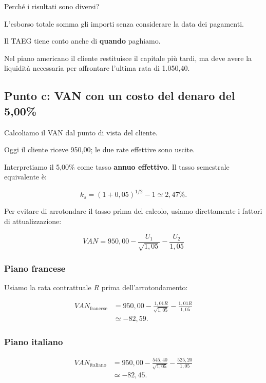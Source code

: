 \noindent Perché i risultati sono diversi?

\noindent L'esborso totale somma gli importi
senza considerare la data dei pagamenti.

\noindent Il TAEG tiene conto anche
di \textbf{quando} paghiamo.

\noindent Nel piano americano il cliente
restituisce il capitale più tardi,
ma deve avere la liquidità necessaria
per affrontare l'ultima rata di 1.050,40.


\subsection*{Punto c: VAN con un costo del denaro del 5,00\%}

\noindent Calcoliamo il VAN
dal punto di vista del cliente.

\noindent Oggi il cliente riceve 950,00;
le due rate effettive sono uscite.

\noindent Interpretiamo il 5,00\%
come tasso \textbf{annuo effettivo}.
Il tasso semestrale equivalente è:

\[
k_s=(1+0{,}05)^{1/2}-1
\simeq2{,}47\%.
\]

\noindent Per evitare di arrotondare il tasso
prima del calcolo, usiamo direttamente
i fattori di attualizzazione:

\[
\boxed{
VAN
=
950{,}00
-\frac{U_1}{\sqrt{1{,}05}}
-\frac{U_2}{1{,}05}
}
\]

\subsubsection*{Piano francese}

\noindent Usiamo la rata contrattuale $R$
prima dell'arrotondamento:

\[
\begin{aligned}
VAN_{\text{francese}}
&=
950{,}00
-\frac{1{,}01R}{\sqrt{1{,}05}}
-\frac{1{,}01R}{1{,}05}\\
&\simeq\boxed{-82{,}59}.
\end{aligned}
\]

\subsubsection*{Piano italiano}

\[
\begin{aligned}
VAN_{\text{italiano}}
&=
950{,}00
-\frac{545{,}40}{\sqrt{1{,}05}}
-\frac{525{,}20}{1{,}05}\\
&\simeq\boxed{-82{,}45}.
\end{aligned}
\]

